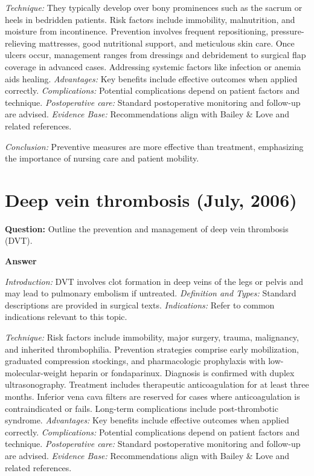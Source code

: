 \documentclass{article}
\begin{document}
\emph{Technique:} They typically develop over bony prominences such as the sacrum or heels in bedridden patients. Risk factors include immobility, malnutrition, and moisture from incontinence. Prevention involves frequent repositioning, pressure-relieving mattresses, good nutritional support, and meticulous skin care. Once ulcers occur, management ranges from dressings and debridement to surgical flap coverage in advanced cases. Addressing systemic factors like infection or anemia aids healing.
\emph{Advantages:} Key benefits include effective outcomes when applied correctly.
\emph{Complications:} Potential complications depend on patient factors and technique.
\emph{Postoperative care:} Standard postoperative monitoring and follow-up are advised.
\emph{Evidence Base:} Recommendations align with Bailey \& Love and related references.

\emph{Conclusion:} Preventive measures are more effective than treatment, emphasizing the importance of nursing care and patient mobility.


\section{Deep vein thrombosis (July, 2006)}

\textbf{Question:} Outline the prevention and management of deep vein thrombosis (DVT).

\textbf{Answer}

\emph{Introduction:} DVT involves clot formation in deep veins of the legs or pelvis and may lead to pulmonary embolism if untreated.
\emph{Definition and Types:} Standard descriptions are provided in surgical texts.
\emph{Indications:} Refer to common indications relevant to this topic.

\emph{Technique:} Risk factors include immobility, major surgery, trauma, malignancy, and inherited thrombophilia. Prevention strategies comprise early mobilization, graduated compression stockings, and pharmacologic prophylaxis with low-molecular-weight heparin or fondaparinux. Diagnosis is confirmed with duplex ultrasonography. Treatment includes therapeutic anticoagulation for at least three months. Inferior vena cava filters are reserved for cases where anticoagulation is contraindicated or fails. Long-term complications include post-thrombotic syndrome.
\emph{Advantages:} Key benefits include effective outcomes when applied correctly.
\emph{Complications:} Potential complications depend on patient factors and technique.
\emph{Postoperative care:} Standard postoperative monitoring and follow-up are advised.
\emph{Evidence Base:} Recommendations align with Bailey \& Love and related references.
\end{document}
